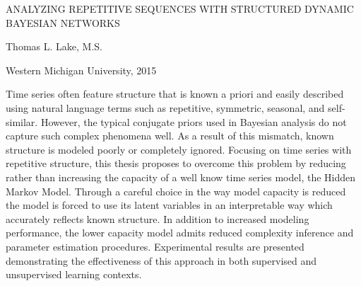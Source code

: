 \thispagestyle{empty}
\begin{center}
    ANALYZING REPETITIVE SEQUENCES WITH STRUCTURED DYNAMIC BAYESIAN NETWORKS

    \vspace{3\baselineskip}
    Thomas L. Lake, M.S.

    \vspace{\baselineskip}
    Western Michigan University, 2015
\end{center}
\vspace{3\baselineskip}
\hspace*{0.5in}
Time series often feature structure that is known a priori and easily described using
natural language terms such as repetitive, symmetric, seasonal, and self-similar.
However, the typical conjugate priors used in Bayesian analysis do not capture such
complex phenomena well.
As a result of this mismatch, known structure is modeled poorly or completely ignored.
Focusing on time series with repetitive structure, this thesis proposes to overcome this
problem by reducing rather than increasing the capacity of a well know time series model,
the Hidden Markov Model.
Through a careful choice in the way model capacity is reduced the model is forced to use
its latent variables in an interpretable way which accurately reflects known structure.
In addition to increased modeling performance, the lower capacity model admits reduced
complexity inference and parameter estimation procedures.
Experimental results are presented demonstrating the effectiveness of this approach
in both supervised and unsupervised learning contexts.
\newpage
\restoregeometry
